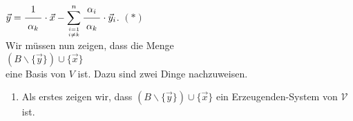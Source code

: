 \hspace*{1.3cm}
$\ds\vec{y} = \bruch{1}{\alpha_k} \cdot \vec{x} - \sum\limits_{i=1 \atop i \not= k}^n
\bruch{\alpha_i}{\alpha_k} \cdot \vec{y}_i$. \hspace*{\fill} $(*)$
\\[0.2cm]
Wir m\"{u}ssen nun zeigen, dass die Menge 
\\[0.2cm]
\hspace*{1.3cm}
 $(B \backslash \{ \vec{y} \}) \cup \{ \vec{x} \}$
\\[0.2cm]
eine Basis von $V$ ist.  Dazu sind zwei Dinge nachzuweisen.
\begin{enumerate}
\item Als erstes zeigen wir, dass  $(B \backslash \{ \vec{y} \}) \cup \{ \vec{x} \}$ ein Erzeugenden-System von $\mathcal{V}$ ist.


\end{enumerate}
